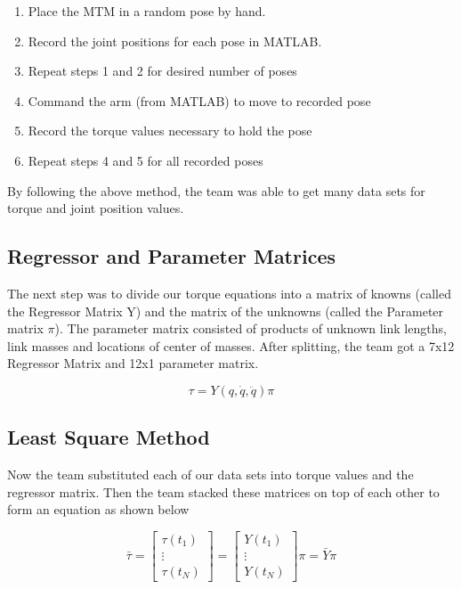 \documentclass[conference]{IEEEtran}
\begin{document}
\begin{enumerate}
		\item Place the MTM in a random pose by hand.
        \item Record the joint positions for each pose in MATLAB.
        \item Repeat steps 1 and 2 for desired number of poses
        \item Command the arm (from MATLAB) to move to recorded pose 
        \item Record the torque values necessary to hold the pose
        \item Repeat steps 4 and 5 for all recorded poses
\end{enumerate}

    
By following the above method, the team was able to get many data sets for torque and joint position values.

\subsection{Regressor and Parameter Matrices}
The next step was to divide our torque equations into a matrix of knowns (called the Regressor Matrix Y) and the matrix of the unknowns (called the Parameter matrix $\pi$). The parameter matrix consisted of products of unknown link lengths, link masses and locations of center of masses. After splitting, the team got a 7x12 Regressor Matrix and 12x1 parameter matrix.

\begin{equation}
\label{regression}
\tau = Y(q,\dot{q},\ddot{q})\pi
\end{equation}

\subsection{Least Square Method}
Now the team substituted each of our data sets into torque values and the regressor matrix. Then the team stacked these matrices on top of each other to form an equation  as shown below

\begin{equation}
\label{least_square}
\bar{\tau} = \begin{bmatrix}
       \tau(t_1)\\[0.3em]
       \vdots\\[0.3em]
       \tau(t_N)
     \end{bmatrix}
     		= \begin{bmatrix}
       Y(t_1)\\[0.3em]
       \vdots\\[0.3em]
       Y(t_N)
     \end{bmatrix} \pi = \bar{Y} \pi
\end{equation}
\end{document}
